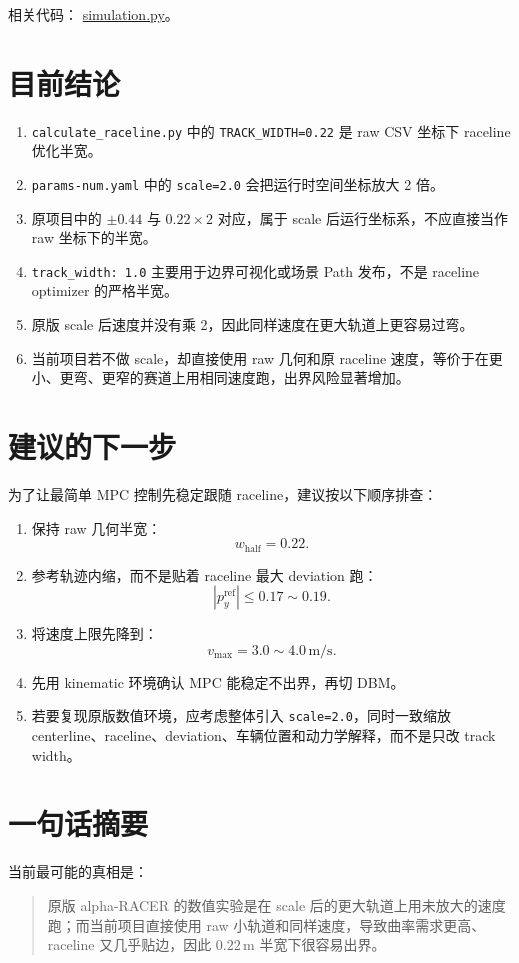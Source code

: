 \documentclass[UTF8]{ctexart}
\begin{document}
相关代码：
\href{https://github.com/CrazalDaver/racer-LLM/blob/main/simulation.py}{simulation.py}。

\section{目前结论}

\begin{enumerate}[label=(\arabic*)]
  \item \texttt{calculate\_raceline.py} 中的 \texttt{TRACK\_WIDTH=0.22} 是 raw CSV 坐标下 raceline 优化半宽。
  \item \texttt{params-num.yaml} 中的 \texttt{scale=2.0} 会把运行时空间坐标放大 2 倍。
  \item 原项目中的 \texttt{\(\pm 0.44\)} 与 $0.22 \times 2$ 对应，属于 scale 后运行坐标系，不应直接当作 raw 坐标下的半宽。
  \item \texttt{track\_width: 1.0} 主要用于边界可视化或场景 Path 发布，不是 raceline optimizer 的严格半宽。
  \item 原版 scale 后速度并没有乘 2，因此同样速度在更大轨道上更容易过弯。
  \item 当前项目若不做 scale，却直接使用 raw 几何和原 raceline 速度，等价于在更小、更弯、更窄的赛道上用相同速度跑，出界风险显著增加。
\end{enumerate}

\section{建议的下一步}

为了让最简单 MPC 控制先稳定跟随 raceline，建议按以下顺序排查：

\begin{enumerate}[label=(\arabic*)]
  \item 保持 raw 几何半宽：
  \[
  w_{\mathrm{half}} = 0.22.
  \]
  \item 参考轨迹内缩，而不是贴着 raceline 最大 deviation 跑：
  \[
  |p_y^{\mathrm{ref}}| \leq 0.17 \sim 0.19.
  \]
  \item 将速度上限先降到：
  \[
  v_{\max} = 3.0 \sim 4.0\,\mathrm{m/s}.
  \]
  \item 先用 kinematic 环境确认 MPC 能稳定不出界，再切 DBM。
  \item 若要复现原版数值环境，应考虑整体引入 \texttt{scale=2.0}，同时一致缩放 centerline、raceline、deviation、车辆位置和动力学解释，而不是只改 track width。
\end{enumerate}

\section{一句话摘要}

当前最可能的真相是：

\begin{quote}
原版 alpha-RACER 的数值实验是在 scale 后的更大轨道上用未放大的速度跑；而当前项目直接使用 raw 小轨道和同样速度，导致曲率需求更高、raceline 又几乎贴边，因此 $0.22\,\mathrm{m}$ 半宽下很容易出界。
\end{quote}
\end{document}
